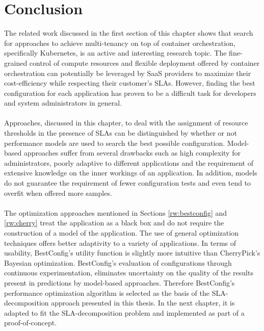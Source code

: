 \section{Conclusion}
\label{rw:conclusion}
The related work discussed in the first section of this chapter shows that search for approaches to achieve multi-tenancy on top of container orchestration, specifically Kubernetes, is an active and interesting research topic. The fine-grained control of compute resources and flexible deployment offered by container orchestration can potentially be leveraged by SaaS providers to maximize their cost-efficiency while respecting their customer's SLAs. However, finding the best configuration for each application has proven to be a difficult task for developers and system administrators in general.\\\\
Approaches, discussed in this chapter, to deal with the assignment of resource thresholds in the presence of SLAs can be distinguished by whether or not performance models are used to search the best possible configuration. Model-based approaches suffer from several drawbacks such as high complexity for administrators, poorly adaptive to different applications and the requirement of extensive knowledge on the inner workings of an application. In addition, models do not guarantee the requirement of fewer configuration tests and even tend to overfit when offered more samples.\\\\
The optimization approaches mentioned in Sections \ref{rw:bestconfig} and \ref{rw:cherry} treat the application as a black box and do not require the construction of a model of the application. The use of general optimization techniques offers better adaptivity to a variety of applications. In terms of usability, BestConfig's utility function is slightly more intuitive than CherryPick's Bayesian optimization. BestConfig's evaluation of configurations through continuous experimentation, eliminates uncertainty on the quality of the results present in predictions by model-based approaches.  Therefore BestConfig's performance optimization algorithm is selected as the basis of the SLA-decomposition approach presented in this thesis. In the next chapter, it is adapted to fit the SLA-decomposition problem and implemented as part of a proof-of-concept.
